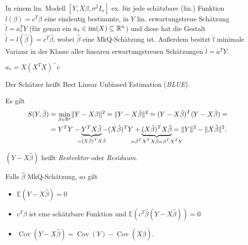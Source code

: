 \documentclass{cheat-sheet}
\newcommand{\E}{\mathbb{E}} %
\DeclareMathOperator{\cov}{Cov} %
\begin{document}

\begin{satz}
  In einem lin. Modell $[Y, X \beta, \sigma^2 I_n]$ ex. für jede schätzbare (lin.) Funktion $l(\beta) = c^T \beta$ eine eindeutig bestimmte, in $Y$ lin. erwartungstreue Schätzung $\hat{l} = a_*^T Y$ (für genau ein $a_* \in \operatorname{im}(X) \subseteq \mathbb{R}^n$) und diese hat die Gestalt $\hat{l} = l(\hat{\beta}) = c^T \hat{\beta}$, wobei $\hat{\beta}$ eine MkQ-Schätzung ist.
  Außerdem besitzt $\hat{l}$ minimale Varianz in der Klasse aller linearen erwartungstreuen Schätzungen $\hat{l} = a^T Y$.
\end{satz}

\begin{konstr}
  $a_* = X (X^T X)^{-} c$
\end{konstr}

\begin{defn}
  Der Schätzer heißt Best Linear Unbiased Estimation (\emph{BLUE}).
\end{defn}


\begin{bem}
  Es gilt
  \begin{align*}
    S(Y, \hat{\beta}) & = \min_{\beta \in \R^p} \norm{Y - X \beta}^2 = \norm{Y - X \hat{\beta}}^2 = (Y - X \hat{\beta})^T (Y - X \hat{\beta}) = \\
    & = Y^T Y - \underbrace{Y^T X \hat{\beta}}_{\mathclap{= (X \hat{\beta})^T X \hat{\beta}}} - (X \hat{\beta})^T Y + \underbrace{(X \hat{\beta})^T X \hat{\beta}}_{\mathclap{= \hat{\beta}^T X^T X \hat{\beta} = \beta^T X^T Y}} = \norm{Y}^2 - \norm{X \hat{\beta}}^2.
  \end{align*}
\end{bem}

\begin{defn}
  $(Y - X \hat{\beta})$ \enspace
  heißt \emph{Restvektor} oder \emph{Residuum}.
\end{defn}

\begin{lem}
  Falls $\hat{\beta}$ MkQ-Schätzung, so gilt
  \begin{itemize}
    \item $\E (Y - X \hat\beta) = 0$
    \item $c^T \beta$ ist eine schätzbare Funktion und $\E (c^T \hat{\beta} (Y - X \hat\beta)) = 0$
    \item $\cov(Y - X \hat\beta) = \cov(Y) - \cov(X \hat\beta)$.
  \end{itemize}
\end{lem}
\end{document}
